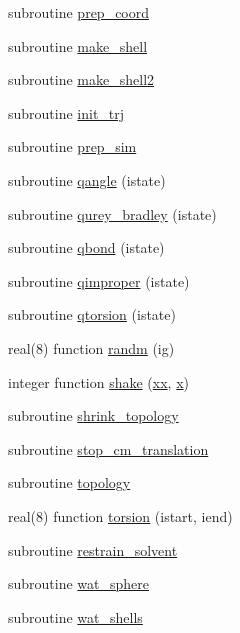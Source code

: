 \begin{DoxyCompactItemize}
\item 
subroutine \hyperlink{classmd_a789709b5ab29545a2dd48b3c1a775a94}{prep\-\_\-coord}
\item 
subroutine \hyperlink{classmd_a744338d7ce921bc19e4a2cc5d572a042}{make\-\_\-shell}
\item 
subroutine \hyperlink{classmd_aea303b7615d20bf4abf1e84b496fd646}{make\-\_\-shell2}
\item 
subroutine \hyperlink{classmd_ac42ae299354d569a17be9cc805d6a2ec}{init\-\_\-trj}
\item 
subroutine \hyperlink{classmd_ada4a4dd8f8f60e863387affbdb27198a}{prep\-\_\-sim}
\item 
subroutine \hyperlink{classmd_a8df60bb5395d0fd328ecf278740c52d5}{qangle} (istate)
\item 
subroutine \hyperlink{classmd_a8eb0098b3fbfaa0093a309da766d38d2}{qurey\-\_\-bradley} (istate)
\item 
subroutine \hyperlink{classmd_a5c33798fd964d738caca617e62c8502d}{qbond} (istate)
\item 
subroutine \hyperlink{classmd_a6d6b7714ab7eedddcfd4faca0cb18ec6}{qimproper} (istate)
\item 
subroutine \hyperlink{classmd_a505ef07cb1df5c0515e2131e06fea4fa}{qtorsion} (istate)
\item 
real(8) function \hyperlink{classmd_a5e3b7b6f11ac03a3ffb18bdaaca242a5}{randm} (ig)
\item 
integer function \hyperlink{classmd_a821fbf756760bf6aa0409f866e977f2e}{shake} (\hyperlink{classmd_a9d2b9bed926d39080b64bdf9d4192fc9}{xx}, \hyperlink{classmd_ac6fbffb623e5a2a3e444dcf6a3c99ff3}{x})
\item 
subroutine \hyperlink{classmd_ae1f9fa050f33fb24d5b27ad81bd4ab09}{shrink\-\_\-topology}
\item 
subroutine \hyperlink{classmd_aaa63dd6ba36fb95cddafec5ed479046f}{stop\-\_\-cm\-\_\-translation}
\item 
subroutine \hyperlink{classmd_a8ca7ff5800e3608fb7aa1aa99b525707}{topology}
\item 
real(8) function \hyperlink{classmd_a59f09f2cc2904f7f60d0e3f032f2d266}{torsion} (istart, iend)
\item 
subroutine \hyperlink{classmd_ab9813e8de816fe8727ce4ab20253c8ae}{restrain\-\_\-solvent}
\item 
subroutine \hyperlink{classmd_a196cbed2a595d85c7609c9d289ff44d4}{wat\-\_\-sphere}
\item 
subroutine \hyperlink{classmd_aff1a619b1f24603784e74c1a04e197a0}{wat\-\_\-shells}

\end{DoxyCompactItemize}
